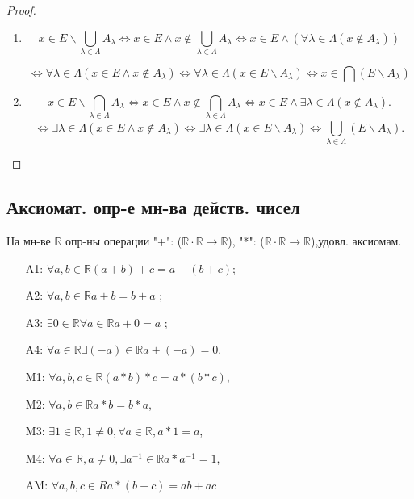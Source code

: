 \documentclass[12pt]{article}
\newcommand{\R}{\mathbb{R}}
\theoremstyle{definition}
\theoremstyle{definition}
\begin{document}
\begin{proof}
~\newline

\begin{enumerate}
    \item 
        \[
            x \in E \backslash \bigcup_{\lambda \in \Lambda} A_\lambda  \iff x \in E \land x \not\in \bigcup_{\lambda \in \Lambda} A_\lambda \iff x \in E \land (\forall \lambda \in \Lambda (x \not\in A_\lambda))
        \]

\[
    \iff \forall \lambda \in \Lambda (x \in E \land x \not\in A_\lambda) \iff \forall \lambda \in \Lambda (x \in E \backslash A_\lambda) \iff x \in \bigcap (E \backslash A_\lambda)
\]
    \item
        \[
            x \in E \backslash \bigcap_{\lambda \in \Lambda}^{}A_\lambda \iff x \in E \land x \not\in \bigcap_{\lambda\in\Lambda}^{}A_\lambda \iff x \in E \land \exists \lambda \in \Lambda (x \not\in A_\lambda)
        .\] 
        \[
        \iff \exists \lambda \in \Lambda (x \in E \land x \not\in A_\lambda) \iff \exists \lambda \in \Lambda (x \in E \backslash A_\lambda) \iff \bigcup_{\lambda \in \Lambda}^{} (E \backslash A_\lambda)
        .\] 
\end{enumerate}

\end{proof}

\subsection{Аксиомат. опр-е мн-ва действ. чисел}

На мн-ве $\R$ опр-ны операции "+": ($\R \cdot \R \rightarrow \R$), "*": ($\R \cdot \R \rightarrow \R$),удовл. аксиомам.

\begin{itemize}
    \item [A1: ] $\forall a, b \in \R (a + b) + c = a + (b + c)$;
    \item [A2: ] $\forall a, b \in \R a + b = b + a$ ;
    \item [A3: ] $\exists 0 \in \R \forall a \in \R a + 0 = a$ ;
    \item [A4: ] $\forall a \in \R \exists (-a) \in \R a + (-a) = 0$.
    \item [M1: ] $\forall a, b, c \in \R (a * b) * c = a * (b * c),$ 
    \item [M2: ] $\forall a, b \in \R a * b = b * a$,
    \item [M3: ] $\exists 1 \in \R, 1 \neq 0, \forall a \in \R, a * 1 = a$,
    \item [M4: ] $\forall a \in \R, a \neq 0, \exists a^{-1} \in \R a * a^{-1} = 1$,
    \item [AM: ] $\forall a, b, c \in R a * (b + c) = ab + ac$
\end{itemize}
\end{document}
